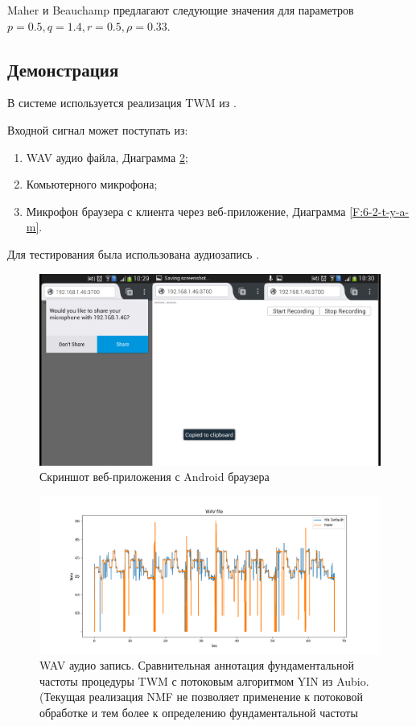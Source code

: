 Maher и Beauchamp предлагают следующие значения для параметров
$p=0.5, q=1.4, r=0.5, \rho=0.33$.

\subsection{Демонстрация}

В системе используется реализация TWM из \cite{L:sms-tools}.

Входной сигнал может поступать из:
\begin{enumerate}
  \item WAV аудио файла, Диаграмма \ref{F:6-2-t-y-a-f};
  \item Комьютерного микрофона;
  \item Микрофон браузера с клиента через веб-приложение,
      Диаграмма \ref{F:6-2-t-y-a-m}.
\end{enumerate}

Для тестирования была использована аудиозапись \cite{L:daj-ci-boza}.

\begin{figure}
  \centering
    \includegraphics[scale=.25]{res/android-firefox-music-recognizer.png}
  \centering
  \caption{Скриншот веб-приложения с Android браузера}
    \label{F:6-2-afmr}
\end{figure}

\begin{figure}
  \centering
    \includegraphics[scale=.5]{res/daj-ci-boze-dobranoc-twm-vs-yin.png}
  \centering
  \caption{WAV аудио запись.
    Сравнительная аннотация фундаментальной частоты процедуры
    TWM с потоковым алгоритмом YIN из Aubio.
    (Текущая реализация NMF не позволяет применение
    к потоковой обработке и тем более к определению фундаментальной
    частоты}
    \label{F:6-2-t-y-a-f}
\end{figure}

